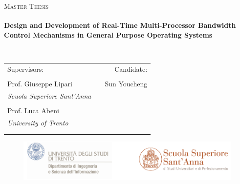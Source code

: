 \begin{titlepage}

\begin{center}
\vspace*{1in}
\textsc{Master Thesis}\\[0.5cm]

\HRule \\[0.4cm] 
{ \large \bfseries Design and Development of Real-Time Multi-Processor Bandwidth
	Control Mechanisms in General Purpose Operating Systems
}

\HRule \\[1.5cm]

 \begin{tabular*}{\textwidth}{@{\extracolsep{\fill}}lcr}
    Supervisors:                        & \hfill & Candidate: \\
    & & \\
    Prof. Giuseppe Lipari                & \hfill & Sun Youcheng\\
    \emph{\scriptsize Scuola Superiore Sant'Anna } & \hfill & \\
    & & \\
    Prof. Luca Abeni   & \hfill & \\
    \emph{\scriptsize University of Trento }        & \hfill & \\
	& & \\
	& & \\
  \end{tabular*}

\begin{figure}[htbp]
        \centering
        \includegraphics[width=\textwidth]{images/logo}
\end{figure}


\end{center}
\end{titlepage}
